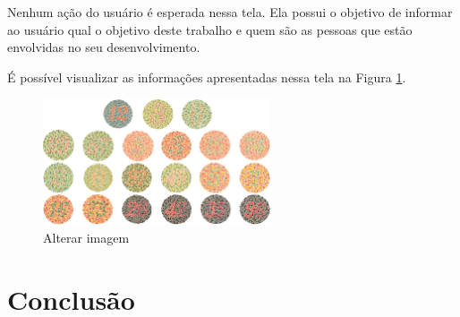 \documentclass[	12pt, Times, openright, twoside, a4paper, english, brazil]{abntex2}
\begin{document}
Nenhum ação do usuário é esperada nessa tela. Ela possui o objetivo de informar ao usuário qual o objetivo deste trabalho e quem são as pessoas que estão envolvidas no seu desenvolvimento.

É possível visualizar as informações apresentadas nessa tela na Figura \ref{fig:figuraSobre}.

\begin{figure}[!htb]
\centering \includegraphics[width=0.6\textwidth]{platesIshihara.png}
\caption{Alterar imagem} \label{fig:figuraSobre}
\end{figure}

\chapter{Conclusão}
\postextual


%


%
%

\end{document}

